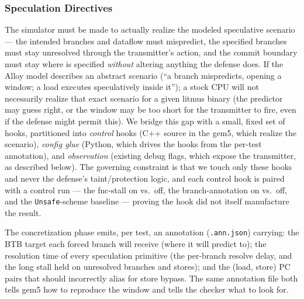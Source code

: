 \subsubsection{Speculation Directives}
The simulator must be made to actually realize the modeled speculative scenario --- the intended branches and dataflow must mispredict, the specified branches must stay unresolved through the transmitter's action, and the commit boundary must stay where is specified \emph{without} altering anything the defense does. If the Alloy model describes an abstract scenario (``a branch mispredicts, opening a window; a load executes speculatively inside it''); a stock CPU will not necessarily realize that exact scenario for a given litmus binary (the predictor may guess right, or the window may be too short for the transmitter to fire, even if the defense might permit this). We bridge this gap with a small, fixed set of hooks, partitioned into \emph{control} hooks (C++ source in the gem5, which realize the scenario), \emph{config glue} (Python, which drives the hooks from the per-test annotation), and \emph{observation} (existing debug flags, which expose the transmitter, as described below). The governing constraint is that we touch only these hooks and never the defense's taint/protection logic, and each control hook is paired with a control run --- the fnc-stall on vs.\ off, the branch-annotation on vs.\ off, and the \texttt{Unsafe}-scheme baseline --- proving the hook did not itself manufacture the result.
\notebr
{}
\notebr

The concretization phase emits, per test, an annotation (\texttt{.ann.json}) carrying: the BTB target each forced branch will receive (where it will predict to); the resolution time of every speculation primitive (the per-branch resolve delay, and the long stall held on unresolved branches and stores); and the (load, store) PC pairs that should incorrectly alias for store bypass.
The same annotation file both tells gem5 how to reproduce the window and tells the checker what to look for.
\notebr
{}
\notebr


